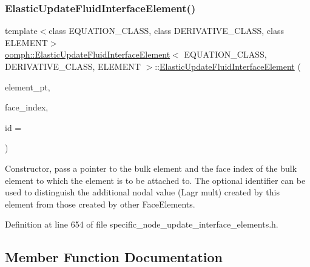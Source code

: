 \subsubsection{\texorpdfstring{Elastic\+Update\+Fluid\+Interface\+Element()}{ElasticUpdateFluidInterfaceElement()}}
{\footnotesize\ttfamily template$<$class E\+Q\+U\+A\+T\+I\+O\+N\+\_\+\+C\+L\+A\+SS, class D\+E\+R\+I\+V\+A\+T\+I\+V\+E\+\_\+\+C\+L\+A\+SS, class E\+L\+E\+M\+E\+NT$>$ \\
\hyperlink{classoomph_1_1ElasticUpdateFluidInterfaceElement}{oomph\+::\+Elastic\+Update\+Fluid\+Interface\+Element}$<$ E\+Q\+U\+A\+T\+I\+O\+N\+\_\+\+C\+L\+A\+SS, D\+E\+R\+I\+V\+A\+T\+I\+V\+E\+\_\+\+C\+L\+A\+SS, E\+L\+E\+M\+E\+NT $>$\+::\hyperlink{classoomph_1_1ElasticUpdateFluidInterfaceElement}{Elastic\+Update\+Fluid\+Interface\+Element} (\begin{DoxyParamCaption}\item[{Finite\+Element $\ast$const \&}]{element\+\_\+pt,  }\item[{const int \&}]{face\+\_\+index,  }\item[{const unsigned \&}]{id = {} }\end{DoxyParamCaption})\hspace{0.3cm}{\ttfamily [inline]}}



Constructor, pass a pointer to the bulk element and the face index of the bulk element to which the element is to be attached to. The optional identifier can be used to distinguish the additional nodal value (Lagr mult) created by this element from those created by other Face\+Elements. 



Definition at line 654 of file specific\+\_\+node\+\_\+update\+\_\+interface\+\_\+elements.\+h.



\subsection{Member Function Documentation}
\mbox{\label{classoomph_1_1ElasticUpdateFluidInterfaceElement_a15c3d2912325ace17676366c1469121f}} 
